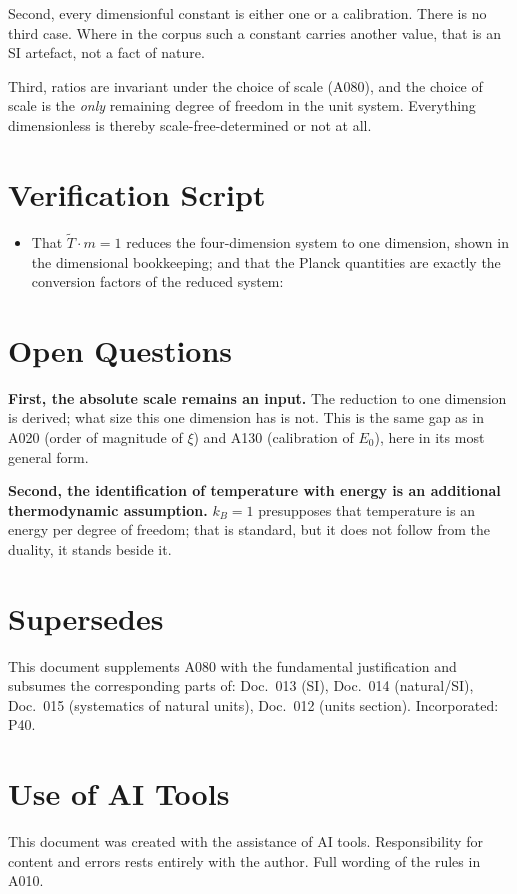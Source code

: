 Second, every dimensionful constant is either one or a calibration. There is no
third case. Where in the corpus such a constant carries another value, that is
an SI artefact, not a fact of nature.

Third, ratios are invariant under the choice of scale (A080), and the choice
of scale is the \emph{only} remaining degree of freedom in the unit system.
Everything dimensionless is thereby scale-free-determined or not at all.

\section{Verification Script}

\begin{itemize}
  \item That $\tilde T\cdot m=1$ reduces the four-dimension system to one
    dimension, shown in the dimensional bookkeeping; and that the Planck
    quantities are exactly the conversion factors of the reduced system:
\end{itemize}

\section{Open Questions}

\textbf{First, the absolute scale remains an input.} The reduction to one
dimension is derived; what size this one dimension has is not. This is the same
gap as in A020 (order of magnitude of $\xi$) and A130 (calibration of $E_0$),
here in its most general form.

\textbf{Second, the identification of temperature with energy is an additional
thermodynamic assumption.} $k_B=1$ presupposes that temperature is an energy
per degree of freedom; that is standard, but it does not follow from the
duality, it stands beside it.

\section{Supersedes}

This document supplements A080 with the fundamental justification and subsumes
the corresponding parts of: Doc.~013 (SI), Doc.~014 (natural/SI), Doc.~015
(systematics of natural units), Doc.~012 (units section). Incorporated: P40.

\section{Use of AI Tools}

This document was created with the assistance of AI tools.
Responsibility for content and errors rests entirely with the author.
Full wording of the rules in A010.
